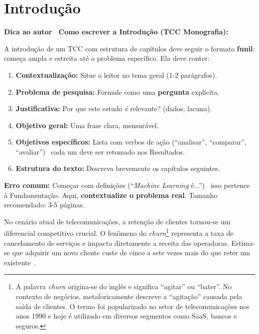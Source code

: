 \documentclass[
    12pt,
    oneside,
    a4paper,
    english,
    brazilian
    ]{abntex2}
\numberwithin{equation}{chapter}
\newenvironment{dica}{%
    \par\medskip
    \color{blue!60!black}\small\itshape
}{%
    \par\medskip
}
\begin{document}
\textual

\chapter{Introdução}

\begin{dica}
\noindent\textbf{Dica ao autor \textemdash\ Como escrever a Introdução (TCC Monografia):}

A introdução de um TCC com estrutura de capítulos deve seguir o formato \textbf{funil}: começa ampla e estreita até o problema específico. Ela deve conter:
\begin{enumerate}
    \item \textbf{Contextualização:} Situe o leitor no tema geral (1-2 parágrafos).
    \item \textbf{Problema de pesquisa:} Formule como uma \textbf{pergunta} explícita.
    \item \textbf{Justificativa:} Por que este estudo \textit{é} relevante? (dados, lacuna).
    \item \textbf{Objetivo geral:} Uma frase clara, mensurável.
    \item \textbf{Objetivos específicos:} Lista com verbos de ação (``analisar'', ``comparar'', ``avaliar'') \textemdash\ cada um deve ser retomado nos Resultados.
    \item \textbf{Estrutura do texto:} Descreva brevemente os capítulos seguintes.
\end{enumerate}
\textbf{Erro comum:} Começar com definições (``\textit{Machine Learning} é...'') \textemdash\ isso pertence à Fundamentação. Aqui, \textbf{contextualize o problema real}. Tamanho recomendado: 3-5 páginas.
\end{dica}

No cenário atual de telecomunicações, a retenção de clientes tornou-se um diferencial competitivo crucial. O fenômeno do \textit{churn}\footnote{A palavra \textit{churn} origina-se do inglês e significa ``agitar'' ou ``bater''. No contexto de negócios, metaforicamente descreve a ``agitação'' causada pela saída de clientes. O termo foi popularizado no setor de telecomunicações nos anos 1990 e hoje é utilizado em diversos segmentos como SaaS, bancos e seguros.} representa a taxa de cancelamento de serviços e impacta diretamente a receita das operadoras. Estima-se que adquirir um novo cliente custe de cinco a sete vezes mais do que reter um existente~\cite{provost2013}.
\end{document}
